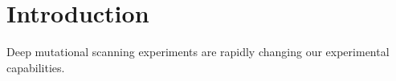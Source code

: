 \documentclass{bmcart}
\begin{document}
\begin{frontmatter}
\begin{abstractbox}
\begin{keyword}
\end{keyword}


\end{abstractbox}
%

\end{frontmatter}





\section*{Introduction}

Deep mutational scanning experiments are rapidly changing our experimental capabilities. 
\end{document}
